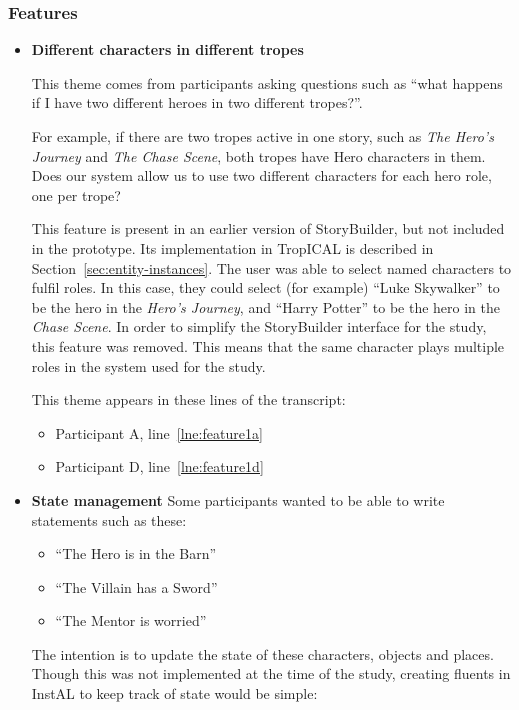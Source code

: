 \documentclass[11pt]{report}
\newcommand{\lref}[1]{\hyperlink{llineno:#1}{\ref*{#1}}}
\begin{document}
\subsubsection{Features}
\begin{itemize}
\item \textbf{Different characters in different tropes}

This theme comes from participants asking questions such as ``what happens if I
have two different heroes in two different tropes?''.

For example, if there are two tropes active in one story, such as \emph{The
  Hero's Journey} and \emph{The Chase Scene}, both tropes have Hero characters
in them. Does our system allow us to use two different characters for each hero
role, one per trope?

This feature is present in an earlier
version of StoryBuilder, but not included in the prototype. Its implementation
in TropICAL is described in Section~\ref{sec:entity-instances}. The user was able to select named characters to fulfil
roles. In this case, they could select (for example) ``Luke Skywalker'' to be
the hero in the \emph{Hero's Journey}, and ``Harry Potter'' to be the hero in
the \emph{Chase Scene}. In order to simplify the StoryBuilder interface for the
study, this feature was removed. This means that the same character plays
multiple roles in the system used for the study.

This theme appears in these lines of the transcript:

\begin{itemize}
\item Participant A, line~\lref{lne:feature1a}
\item Participant D, line~\lref{lne:feature1d}
\end{itemize}

\item \textbf{State management}
  Some participants wanted to be able to write statements such as these:

  \begin{itemize}
    \item ``The Hero is in the Barn''
    \item ``The Villain has a Sword''
    \item ``The Mentor is worried''
  \end{itemize}

  The intention is to update the state of these characters, objects and places.
  Though this was not implemented at the time of the study, creating fluents in
  InstAL to keep track of state would be simple:


\end{itemize}
\end{document}
